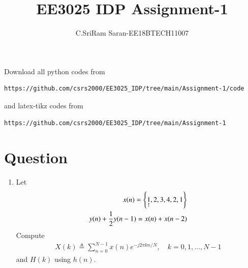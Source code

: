 \documentclass[journal,12pt,twocolumn]{IEEEtran}
\renewcommand\thesection{\arabic{section}}
\begin{document}
\providecommand{\fourier}{\overset{\mathcal{F}}{ \rightleftharpoons}}
\providecommand{\system}{\overset{\mathcal{H}}{ \longleftrightarrow}}
\newcommand{\solution}{\noindent \textbf{Solution: }}
\newcommand{\cosec}{\,\text{cosec}\,}
\providecommand{\dec}[2]{\ensuremath{\overset{#1}{\underset{#2}{\gtrless}}}}
\newcommand{\myvec}[1]{\ensuremath{\begin{pmatrix}#1\end{pmatrix}}}
\newcommand{\mydet}[1]{\ensuremath{\begin{vmatrix}#1\end{vmatrix}}}
\makeatletter
{}
\makeatother
\let\StandardTheFigure\thefigure
\let\vec\mathbf
\renewcommand{\thefigure}{\theproblem}
\def\putbox#1#2#3{\makebox[0in][l]{\makebox[#1][l]{}\raisebox{\baselineskip}[0in][0in]{\raisebox{#2}[0in][0in]{#3}}}}
     \def\rightbox#1{\makebox[0in][r]{#1}}
     \def\centbox#1{\makebox[0in]{#1}}
     \def\topbox#1{\raisebox{-\baselineskip}[0in][0in]{#1}}
     \def\midbox#1{\raisebox{-0.5\baselineskip}[0in][0in]{#1}}
\vspace{3cm}
\title{EE3025 IDP Assignment-1}
\author{C.SriRam Saran-EE18BTECH11007}
\maketitle
\newpage
\bigskip
\renewcommand{\thefigure}{\theenumi}
\renewcommand{\thetable}{\theenumi}
Download all python codes from 
\begin{lstlisting}
https://github.com/csrs2000/EE3025_IDP/tree/main/Assignment-1/code
\end{lstlisting}
%
and latex-tikz codes from 
%
\begin{lstlisting}
https://github.com/csrs2000/EE3025_IDP/tree/main/Assignment-1
\end{lstlisting}
\section{Question}
\begin{enumerate}[label=\thesection.\arabic*.,ref=\thesection.\theenumi]
    
\item Let
\begin{align}
    x(n) = \left\{\underset{\uparrow}{1},2,3,4,2,1\right\} \\
    y(n) + \frac{1}{2}y(n-1) = x(n) + x(n-2) \label{eq:1.0.2}
\end{align}
Compute
\begin{align}
    X(k) \triangleq \sum_{n=0}^{N-1}x(n)e^{-j2\pi kn/N},\quad k=0,1, \ldots, N-1
\end{align}
and $H(k)$ using $h(n)$.
\end{enumerate}
\end{document}
